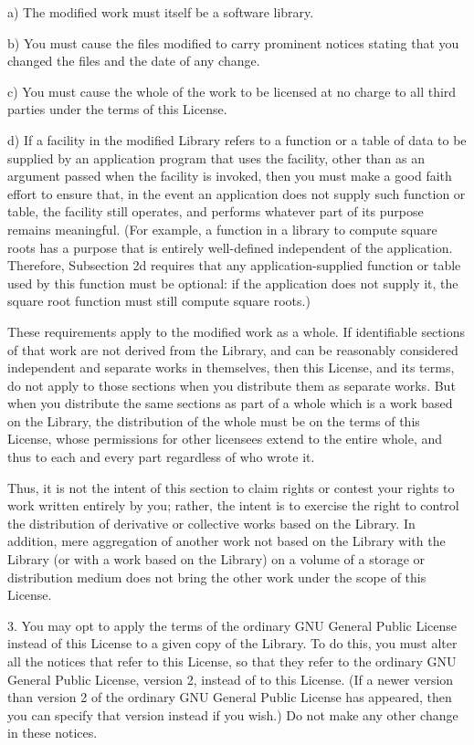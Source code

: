 a) The modified work must itself be a software library.

b) You must cause the files modified to carry prominent notices stating that you changed the files and the date of any change.

c) You must cause the whole of the work to be licensed at no charge to all third parties under the terms of this License.

d) If a facility in the modified Library refers to a function or a table of data to be supplied by an application program that uses the facility, other than as an argument passed when the facility is invoked, then you must make a good faith effort to ensure that, in the event an application does not supply such function or table, the facility still operates, and performs whatever part of its purpose remains meaningful. (For example, a function in a library to compute square roots has a purpose that is entirely well-defined independent of the application. Therefore, Subsection 2d requires that any application-supplied function or table used by this function must be optional: if the application does not supply it, the square root function must still compute square roots.)

These requirements apply to the modified work as a whole. If identifiable sections of that work are not derived from the Library, and can be reasonably considered independent and separate works in themselves, then this License, and its terms, do not apply to those sections when you distribute them as separate works. But when you distribute the same sections as part of a whole which is a work based on the Library, the distribution of the whole must be on the terms of this License, whose permissions for other licensees extend to the entire whole, and thus to each and every part regardless of who wrote it.

Thus, it is not the intent of this section to claim rights or contest your rights to work written entirely by you; rather, the intent is to exercise the right to control the distribution of derivative or collective works based on the Library. In addition, mere aggregation of another work not based on the Library with the Library (or with a work based on the Library) on a volume of a storage or distribution medium does not bring the other work under the scope of this License.

3. You may opt to apply the terms of the ordinary GNU General Public License instead of this License to a given copy of the Library. To do this, you must alter all the notices that refer to this License, so that they refer to the ordinary GNU General Public License, version 2, instead of to this License. (If a newer version than version 2 of the ordinary GNU General Public License has appeared, then you can specify that version instead if you wish.) Do not make any other change in these notices.

